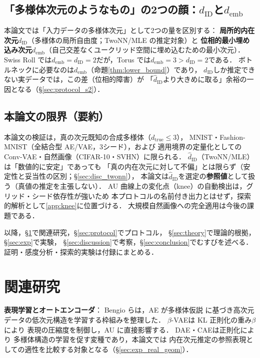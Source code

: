 \documentclass[11pt,a4paper]{jsarticle}
\newcommand{\dID}{d_{\mathrm{ID}}}
\newcommand{\hatdID}{\hat{d}_{\mathrm{ID}}}
\newcommand{\dtrue}{d_{\mathrm{true}}}
\newcommand{\demb}{d_{\mathrm{emb}}}
\begin{document}
\subsection{「多様体次元のようなもの」の2つの顔：$\dID$と$\demb$}\label{sec:intro_dim}

本論文では「入力データの多様体次元」として2つの量を区別する：
\textbf{局所的内在次元}$\dID$（多様体の局所自由度；TwoNN/MLE の推定対象）と
\textbf{位相的最小埋め込み次元}$\demb$（自己交差なくユークリッド空間に埋め込むための最小次元）．
Swiss Roll では$\demb = \dID = 2$だが，Torus では$\demb = 3 > \dID = 2$である．
ボトルネックに必要なのは$\demb$（命題\ref{thm:lower_bound}）であり，
$\dID$しか推定できない実データでは，この差（位相的障害）が
「$\hatdID$より大きめに取る」余裕の一因となる（§\ref{sec:protocol_s2}）．

\subsection{本論文の限界（要約）}\label{sec:intro_limits}

本論文の検証は，真の次元既知の合成多様体（$\dtrue \leq 3$），
MNIST・Fashion-MNIST（全結合型 AE/VAE，3シード），および
適用境界の定量化としての Conv-VAE・自然画像（CIFAR-10・SVHN）に限られる．
$\hatdID$（TwoNN/MLE）は「数値的に安定」であっても
「真の内在次元に対して不偏」とは限らず（安定性と妥当性の区別；§\ref{sec:disc_twonn}），
本論文は$\hatdID$を選定の\textbf{参照値}として扱う（真値の推定を主張しない）．
AU 曲線上の変化点（knee）の自動検出は，グリッド・シード依存性が強いため
本プロトコルの名前付き出力とはせず，探索的解析として\ref{app:knee}に位置づける．
大規模自然画像への完全適用は今後の課題である．

以降，§\ref{sec:related}で関連研究，§\ref{sec:protocol}でプロトコル，
§\ref{sec:theory}で理論的根拠，§\ref{sec:exp}で実験，
§\ref{sec:discussion}で考察，§\ref{sec:conclusion}でむすびを述べる．
証明・感度分析・探索的実験は付録にまとめる．

\section{関連研究}\label{sec:related}

\textbf{表現学習とオートエンコーダ}：
Bengio ら\cite{bengio2013representation}は，AE が多様体仮説
\cite{fefferman2016manifold}に基づき高次元データの低次元構造を学習する枠組みを整理した．
$\beta$-VAE\cite{higgins2017betavae}は KL 正則化の重み$\beta$により
表現の圧縮度を制御し，AU に直接影響する．
DAE\cite{alain2014dae}・CAE\cite{rifai2011cae}は正則化により
多様体構造の学習を促す変種であり，本論文では
内在次元推定の参照表現としての適性を比較する対象となる（§\ref{sec:exp_real_geom}）．
\end{document}
